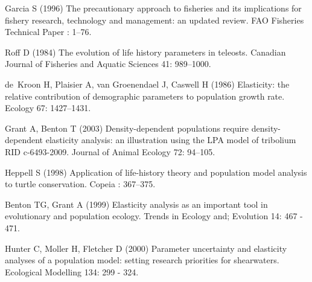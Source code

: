 \documentclass{pnastwo}
\begin{document}
\begin{article}



 

\begin{thebibliography}{10}

Garcia S (1996) The precautionary approach to fisheries and its implications
  for fishery research, technology and management: an updated review.
FAO Fisheries Technical Paper : 1--76.

Roff D (1984) The evolution of life history parameters in teleosts.
Canadian Journal of Fisheries and Aquatic Sciences 41: 989--1000.

de~Kroon H, Plaisier A, van Groenendael J, Caswell H (1986) Elasticity: the
  relative contribution of demographic parameters to population growth rate.
Ecology 67: 1427--1431.

Grant A, Benton T (2003) Density-dependent populations require
  density-dependent elasticity analysis: an illustration using the {LPA} model
  of tribolium {RID} c-6493-2009.
Journal of Animal Ecology 72: 94--105.

Heppell S (1998) Application of life-history theory and population model
  analysis to turtle conservation.
Copeia : 367--375.

Benton TG, Grant A (1999) Elasticity analysis as an important tool in
  evolutionary and population ecology.
Trends in Ecology and; Evolution 14: 467 - 471.

Hunter C, Moller H, Fletcher D (2000) Parameter uncertainty and elasticity
  analyses of a population model: setting research priorities for shearwaters.
Ecological Modelling 134: 299 - 324.


\end{thebibliography}
\end{article}
\end{document}
